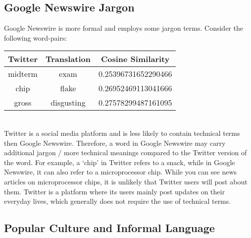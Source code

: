 \documentclass[11pt,a4paper]{article}
\begin{document}
\subsection{Google Newswire Jargon}
Google Newswire is more formal and employs some jargon terms. Consider the following word-pairs:
\begin{table}[!htb]
\begin{tabular}{|c|c|c|}
\hline
Twitter & Translation & Cosine Similarity \\
\hline
midterm & exam & 0.25396731652290466 \\
chip & flake & 0.26952469113041666 \\
gross & disgusting & 0.27578299487161095 \\
\hline
\end{tabular}
\end{table}\\
Twitter is a social media platform and is less likely to contain technical terms then Google Newswire. Therefore, a word in Google Newswire may carry additional jargon / more technical meanings compared to the Twitter version of the word. For example, a `chip' in Twitter refers to a snack, while in Google Newswire, it can also refer to a microprocessor chip. While you can see news articles on microprocessor chips, it is unlikely that Twitter users will post about them. Twitter is a platform where its users mainly post updates on their everyday lives, which generally does not require the use of technical terms.

\subsection{Popular Culture and Informal Language}
\end{document}
